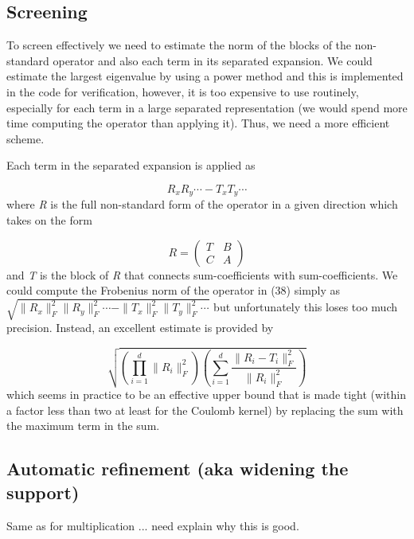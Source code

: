 \documentclass[letterpaper]{book}
\begin{document}
\subsection{Screening}
To screen effectively we need to estimate the norm of the blocks of the non-standard operator and also each term in its
separated expansion. We could estimate the largest eigenvalue by using a power method and this is implemented in the
code for verification, however, it is too expensive to use routinely, especially for each term in a large separated
representation (we would spend more time computing the operator than applying it). Thus, we need a more efficient
scheme.

Each term in the separated expansion is applied as 

\begin{equation}\label{seq:refText37}
R_{x}R_{y}\cdots -T_{x}T_{y}\cdots 
\end{equation}
where \textit{R} is the full non-standard form of the operator in a given direction which takes on the form 

\begin{equation}
R=\left(\begin{matrix}T&B\\C&A\end{matrix}\right)
\end{equation}
and \textit{T} is the block of\textit{ R }that connects sum-coefficients with sum-coefficients. We could compute the
Frobenius norm of the operator in (38) simply as  $\sqrt{\|R_{x}\|_{F}^{2}\|R_{y}\|_{F}^{2}\cdots
-\|T_{x}\|_{F}^{2}\|T_{y}\|_{F}^{2}\cdots }$ but unfortunately this loses too much precision. Instead, an excellent
estimate is provided by 

\begin{equation}
\sqrt{\left(\prod _{i=1}^{d}{\|R_{i}\|_{F}^{2}}\right)\left(\sum
_{i=1}^{d}{\frac{\|R_{i}-T_{i}\|_{F}^{2}}{\|R_{i}\|_{F}^{2}}}\right)}
\end{equation}
which seems in practice to be an effective upper bound that is made tight (within a factor less than two at least for
the Coulomb kernel) by replacing the sum with the maximum term in the sum.

\subsection[Automatic refinement (aka widening the support)]{Automatic refinement (aka widening the support)}
Same as for multiplication ... need explain why this is good.
\end{document}
